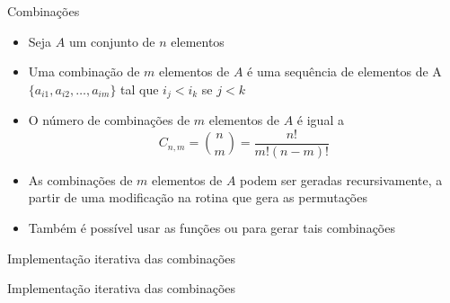 \begin{frame}[fragile]{Combinações}

    \begin{itemize}
        \item Seja $A$ um conjunto de $n$ elementos

        \item Uma combinação de $m$ elementos de $A$ é uma sequência de elementos de
            A $\lbrace a_{i1}, a_{i2}, \ldots, a_{im}\rbrace$ tal que $i_j < i_k$ se $j < k$

        \item O número de combinações de $m$ elementos de $A$ é igual a 
        \[
            C_{n,m} = \binom{n}{m} = \frac{n!}{m!(n - m)!}
        \]

        \item As combinações de $m$ elementos de $A$ podem ser geradas recursivamente, a
            partir de uma modificação na rotina que gera as permutações

        \item Também é possível usar as funções  ou
             para gerar tais combinações
            
    \end{itemize}

\end{frame}

\begin{frame}[fragile]{Implementação iterativa das combinações}
\end{frame}

\begin{frame}[fragile]{Implementação iterativa das combinações}
\end{frame}

